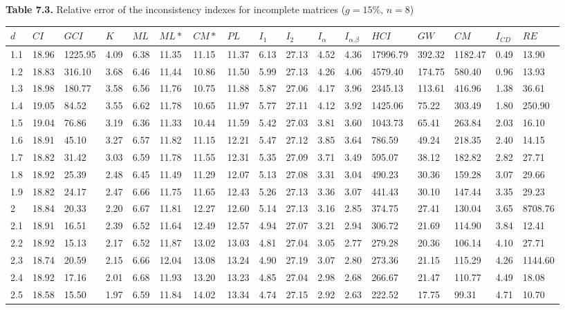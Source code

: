 \newpage
\textbf{Table 7.3.} Relative error of the inconsistency indexes for incomplete matrices ($g=15\%$, $n=8$)
\begin{adjustbox}{angle=90}
  \begin{center}
    \begin{tabular}{|l|llllllllllllllll|}
      \hline $d$ &
$CI$&$GCI$&$K$&$ML$&$ML*$&$CM*$&$PL$&$I_1$&$I_2$&$I_{\alpha}$&$I_{\alpha.\beta}$&$HCI$&$GW$&$CM$&$I_{CD}$&$RE$\\ \hline \hline
1.1&18.96&1225.95&4.09&6.38&11.35&11.15&11.37&6.13&27.13&4.52&4.36&17996.79&392.32&1182.47&0.49&13.90  \\ 
1.2&18.83&316.10&3.68&6.46&11.44&10.86&11.50&5.99&27.13&4.26&4.06&4579.40&174.75&580.40&0.96&13.93  \\ 
1.3&18.98&180.77&3.58&6.56&11.76&10.75&11.88&5.87&27.06&4.17&3.96&2345.13&113.61&416.96&1.38&36.61  \\ 
1.4&19.05&84.52&3.55&6.62&11.78&10.65&11.97&5.77&27.11&4.12&3.92&1425.06&75.22&303.49&1.80&250.90  \\ 
1.5&19.04&76.86&3.19&6.36&11.33&10.44&11.59&5.42&27.03&3.81&3.60&1043.73&65.41&263.84&2.03&16.10  \\ 
1.6&18.91&45.10&3.27&6.57&11.82&11.15&12.21&5.47&27.12&3.85&3.64&786.59&49.24&218.35&2.40&14.15  \\ 
1.7&18.82&31.42&3.03&6.59&11.78&11.55&12.31&5.35&27.09&3.71&3.49&595.07&38.12&182.82&2.82&27.71  \\ 
1.8&18.92&25.39&2.48&6.45&11.49&11.29&12.07&5.13&27.08&3.31&3.04&490.23&30.36&159.28&3.07&29.66  \\ 
1.9&18.82&24.17&2.47&6.66&11.75&11.65&12.43&5.26&27.13&3.36&3.07&441.43&30.10&147.44&3.35&29.23  \\ 
2 &18.84&20.33&2.20&6.67&11.81&12.27&12.60&5.14&27.13&3.16&2.85&374.75&27.41&130.04&3.65&8708.76  \\ 
2.1&18.91&16.51&2.39&6.52&11.64&12.49&12.57&4.94&27.07&3.21&2.94&306.72&21.69&114.90&3.84&12.41  \\ 
2.2&18.92&15.13&2.17&6.52&11.87&13.02&13.03&4.81&27.04&3.05&2.77&279.28&20.36&106.14&4.10&27.71  \\ 
2.3&18.74&20.59&2.15&6.66&12.04&13.08&13.24&4.90&27.19&3.07&2.80&273.36&21.15&115.29&4.26&1144.60  \\ 
2.4&18.92&17.16&2.01&6.68&11.93&13.20&13.23&4.85&27.04&2.98&2.68&266.67&21.47&110.77&4.49&18.08  \\ 
2.5&18.58&15.50&1.97&6.59&11.84&14.02&13.34&4.74&27.15&2.92&2.63&222.52&17.75&99.31&4.71&10.70  \\ 

\end{tabular}
\end{center}
\end{adjustbox}
